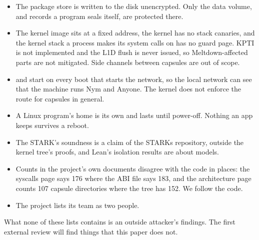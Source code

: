 \begin{itemize}
\item The package store is written to the disk unencrypted. Only the data volume, and records a program seals itself, are protected there.
\item The kernel image sits at a fixed address, the kernel has no stack canaries, and the kernel stack a process makes its system calls on has no guard page. KPTI is not implemented and the L1D flush is never issued, so Meltdown-affected parts are not mitigated. Side channels between capsules are out of scope.
\item {} and  start on every boot that starts the network, so the local network can see that the machine runs Nym and Anyone. The kernel does not enforce the route for capsules in general.
\item A Linux program's home is its own and lasts until power-off. Nothing an app keeps survives a reboot.
\item The STARK's soundness is a claim of the STARKs repository, outside the kernel tree's proofs, and Lean's isolation results are about models.
\item Counts in the project's own documents disagree with the code in places: the syscalls page says 176 where the ABI file says 183, and the architecture page counts 107 capsule directories where the tree has 152. We follow the code.
\item The project lists its team as two people.
\end{itemize}

What none of these lists contains is an outside attacker's findings. The first external review will find things that this paper does not.

